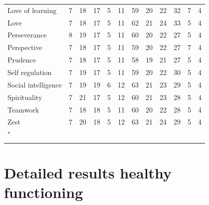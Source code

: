 \documentclass[
  man,floatsintext]{apa6}
\begin{document}
\begin{table}
{\begin{tabular}[t]{llcccccccccc}
Love of learning & 7 & 18 & 17 & 5 & 11 & 59 & 20 & 22 & 32 & 7 & 4\\
\addlinespace
Love & 7 & 18 & 17 & 5 & 11 & 62 & 21 & 24 & 33 & 5 & 4\\
Perseverance & 8 & 19 & 17 & 5 & 11 & 60 & 20 & 22 & 27 & 5 & 4\\
Perspective & 7 & 18 & 17 & 5 & 11 & 59 & 20 & 22 & 27 & 7 & 4\\
Prudence & 7 & 18 & 17 & 5 & 11 & 58 & 19 & 21 & 27 & 5 & 4\\
Self regulation & 7 & 19 & 17 & 5 & 11 & 59 & 20 & 22 & 30 & 5 & 4\\
\addlinespace
Social intelligence & 7 & 19 & 19 & 6 & 12 & 63 & 21 & 23 & 29 & 5 & 4\\
Spirituality & 7 & 21 & 17 & 5 & 12 & 60 & 21 & 23 & 28 & 5 & 4\\
Teamwork & 7 & 18 & 18 & 5 & 11 & 60 & 20 & 22 & 28 & 5 & 4\\
Zest & 7 & 20 & 18 & 5 & 12 & 63 & 21 & 24 & 29 & 5 & 4\\
\bottomrule
\multicolumn{12}{l}{\textsuperscript{*} }\\
\end{tabular}}
\end{table}

\newpage

\hypertarget{detailed-results-healthy-functioning}{%
\section{Detailed results healthy functioning}\label{detailed-results-healthy-functioning}}
\end{document}
